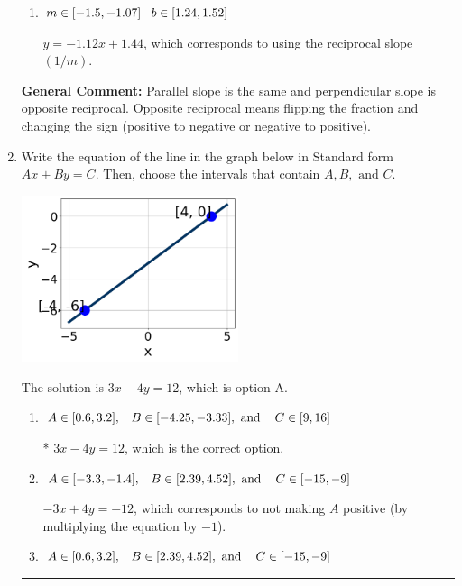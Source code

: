 \documentclass{extbook}[14pt]
\newcommand{\litem}[1]{\item #1

\rule{\textwidth}{0.4pt}}
\begin{document}
\begin{enumerate}
{\begin{enumerate}[label=\Alph*.]
 $y = -0.89x - 1.44$, which corresponds to using the correct slope and getting the negative $y$-intercept.
\item \( m \in [-1.5, -1.07] \hspace*{3mm} b \in [1.24, 1.52] \)

 $y = -1.12x + 1.44$, which corresponds to using the reciprocal slope $(1/m)$.
\end{enumerate}

\textbf{General Comment:} Parallel slope is the same and perpendicular slope is opposite reciprocal. Opposite reciprocal means flipping the fraction and changing the sign (positive to negative or negative to positive).
}
\litem{
Write the equation of the line in the graph below in Standard form $Ax+By=C$. Then, choose the intervals that contain $A, B, \text{ and } C$.

\begin{center}
    \includegraphics[width=0.5\textwidth]{../Figures/linearGraphToStandardCopyB.png}
\end{center}


The solution is \( 3x - 4y = 12 \), which is option A.\begin{enumerate}[label=\Alph*.]
\item \( A \in [0.6, 3.2], \hspace{3mm} B \in [-4.25, -3.33], \text{ and } \hspace{3mm} C \in [9, 16] \)

* $3x - 4y = 12$, which is the correct option.
\item \( A \in [-3.3, -1.4], \hspace{3mm} B \in [2.39, 4.52], \text{ and } \hspace{3mm} C \in [-15, -9] \)

 $-3x + 4y = -12$, which corresponds to not making $A$ positive (by multiplying the equation by $-1$).
\item \( A \in [0.6, 3.2], \hspace{3mm} B \in [2.39, 4.52], \text{ and } \hspace{3mm} C \in [-15, -9] \)


\end{enumerate}}
\end{enumerate}
\end{document}
